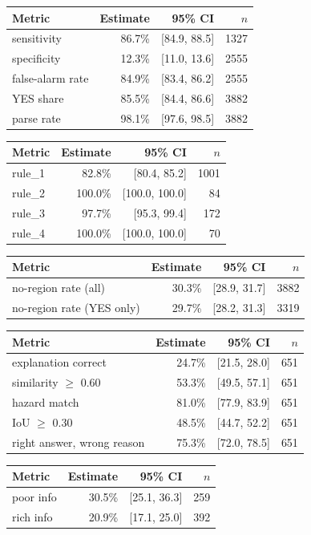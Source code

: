 \begin{tabular}{lrrr}
\toprule
Metric & Estimate & 95\% CI & $n$ \\
\midrule
sensitivity & 86.7\% & [84.9, 88.5] & 1327 \\
specificity & 12.3\% & [11.0, 13.6] & 2555 \\
false-alarm rate & 84.9\% & [83.4, 86.2] & 2555 \\
YES share & 85.5\% & [84.4, 86.6] & 3882 \\
parse rate & 98.1\% & [97.6, 98.5] & 3882 \\
\bottomrule
\end{tabular}

\begin{tabular}{lrrr}
\toprule
Metric & Estimate & 95\% CI & $n$ \\
\midrule
rule\_1 & 82.8\% & [80.4, 85.2] & 1001 \\
rule\_2 & 100.0\% & [100.0, 100.0] & 84 \\
rule\_3 & 97.7\% & [95.3, 99.4] & 172 \\
rule\_4 & 100.0\% & [100.0, 100.0] & 70 \\
\bottomrule
\end{tabular}

\begin{tabular}{lrrr}
\toprule
Metric & Estimate & 95\% CI & $n$ \\
\midrule
no-region rate (all) & 30.3\% & [28.9, 31.7] & 3882 \\
no-region rate (YES only) & 29.7\% & [28.2, 31.3] & 3319 \\
\bottomrule
\end{tabular}

\begin{tabular}{lrrr}
\toprule
Metric & Estimate & 95\% CI & $n$ \\
\midrule
explanation correct & 24.7\% & [21.5, 28.0] & 651 \\
similarity $\geq$ 0.60 & 53.3\% & [49.5, 57.1] & 651 \\
hazard match & 81.0\% & [77.9, 83.9] & 651 \\
IoU $\geq$ 0.30 & 48.5\% & [44.7, 52.2] & 651 \\
right answer, wrong reason & 75.3\% & [72.0, 78.5] & 651 \\
\bottomrule
\end{tabular}

\begin{tabular}{lrrr}
\toprule
Metric & Estimate & 95\% CI & $n$ \\
\midrule
poor info & 30.5\% & [25.1, 36.3] & 259 \\
rich info & 20.9\% & [17.1, 25.0] & 392 \\
\bottomrule
\end{tabular}

